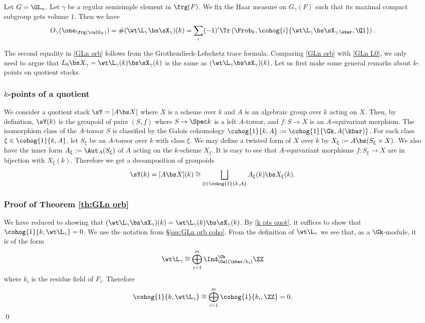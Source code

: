 \begin{theorem}\label{th:GLn orb} Let $G=\GL_{n}$. Let $\gamma$ be a regular semisimple element in $\frg(F)$. We fix the Haar measure on $G_{\gamma}(F)$ such that its maximal compact subgroup gets volume $1$. Then we have
\begin{equation}\label{GLn orb}
O_{\gamma}(\one_{\frg(\calO_{F})})=\#(\wt\L_{\gamma}\bs\sX_{\gamma})(k)=\sum_{i}(-1)^{i}\Tr\left(\Frob_{k}, \cohog{i}{\wt\L_{\gamma}\bs\sX_{\gamma,\kbar},\Ql}\right).
\end{equation}
\end{theorem}

The second equality in \eqref{GLn orb} follows from the Grothendieck-Lefschetz trace formula. Comparing \eqref{GLn orb} with \eqref{GLn L0}, we only need to argue that $L_{0}\bs X_{\gamma}=\wt\L_{\gamma}(k)\bs \sX_{\gamma}(k)$ is the same as $(\wt\L_{\gamma}\bs\sX_{\gamma})(k)$. Let us first make some general remarks about $k$-points on quotient stacks.

\subsubsection{$k$-points of a quotient}\label{sss:k pts quot} We consider  a quotient stack $\sY=[A\bs X]$ where $X$ is a scheme over $k$ and $A$ is an algebraic group over $k$ acting on $X$. Then, by definition, $\sY(k)$ is the groupoid of pairs $(S, f)$ where $S\to \Spec k$
is a left $A$-torsor, and $f:S\to X$ is an $A$-equivariant morphism. The isomorphism class of the $A$-torsor $S$ is classified by the Galois cohomology $\cohog{1}{k, A}:=\cohog{1}{\Gk,A(\kbar)}$. For each class $\xi\in \cohog{1}{k,A}$, let $S_{\xi}$ be an $A$-torsor over $k$ with class $\xi$. We may define a twisted form of $X$ over $k$ by $X_{\xi}:=A\bs (S_{\xi}\times X)$. We also have the inner form $A_{\xi}:=\Aut_{A}(S_{\xi})$ of $A$ acting on the $k$-scheme $X_{\xi}$. It is easy to see that $A$-equivariant morphisms $f:S_{\xi}\to X$ are in bijection with $X_{\xi}(k)$. Therefore we get a decomposition of groupoids
\begin{equation}\label{k pts quot}
\sY(k)=[A\bs X](k)\cong\bigsqcup_{\xi\in\cohog{1}{k,A}}A_{\xi}(k)\bs X_{\xi}(k).
\end{equation}


\subsubsection{Proof of Theorem \ref{th:GLn orb}} We have reduced to showing that $(\wt\L_{\gamma}\bs\sX_{\gamma})(k)= \wt\L_{\gamma}(k)\bs \sX_{\gamma}(k)$. By \eqref{k pts quot}, it suffices to show that $\cohog{1}{k,\wt\L_{\gamma}}=0$. We use the notation from \S\ref{sss:GLn orb coho}. From the definition of $\wt\L_{\gamma}$ we see that, as a $\Gk$-module, it is of the form
\begin{equation*}
\wt\L_{\gamma}\cong \bigoplus_{i=1}^{m}\Ind^{\Gk}_{\Gal(\kbar/k_{i})}\ZZ
\end{equation*}
where $k_{i}$ is the residue field of $F_{i}$. Therefore
\begin{equation*}
\cohog{1}{k,\wt\L_{\gamma}}\cong\bigoplus_{i=1}^{m}\cohog{1}{k_{i},\ZZ}=0.
\end{equation*}
\qed


